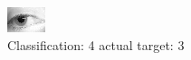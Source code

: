 \begin{figure}[h!]
\begin{center}
\includegraphics[width=0.60\columnwidth]{figures/ID1386_class_4_target_3.png}
\end{center}
\caption{ Classification: 4 actual target: 3}
\label{fig:ID1386_class_4_target_3}
\end{figure}

